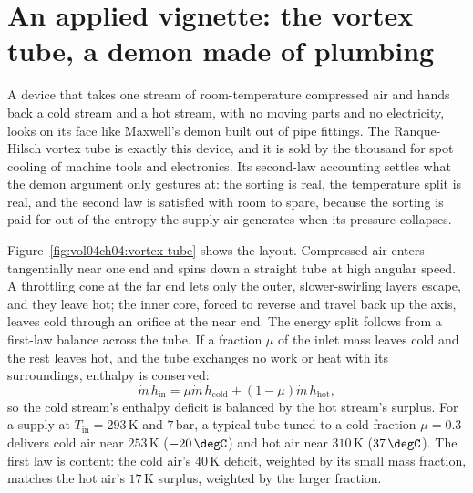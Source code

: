 

\section{An applied vignette: the vortex tube, a demon made of plumbing}

A device that takes one stream of room-temperature compressed air and hands back
a cold stream and a hot stream, with no moving parts and no electricity, looks
on its face like Maxwell's demon built out of pipe fittings. The Ranque-Hilsch
vortex tube is exactly this device, and it is sold by the thousand for spot
cooling of machine tools and electronics. Its second-law accounting settles what
the demon argument only gestures at: the sorting is real, the temperature split
is real, and the second law is satisfied with room to spare, because the sorting
is paid for out of the entropy the supply air generates when its pressure
collapses.

Figure~\ref{fig:vol04ch04:vortex-tube} shows the layout. Compressed air enters
tangentially near one end and spins down a straight tube at high angular speed.
A throttling cone at the far end lets only the outer, slower-swirling layers
escape, and they leave hot; the inner core, forced to reverse and travel back up
the axis, leaves cold through an orifice at the near end. The energy split
follows from a first-law balance across the tube. If a fraction $\mu$ of the
inlet mass leaves cold and the rest leaves hot, and the tube exchanges no work
or heat with its surroundings, enthalpy is conserved:
\[
\dot m\, h_{\text{in}} = \mu \dot m\, h_{\text{cold}} + (1-\mu)\dot m\,
h_{\text{hot}},
\]
so the cold stream's enthalpy deficit is balanced by the hot stream's surplus.
For a supply at $T_{\text{in}} = 293\,\si{\kelvin}$ and $7\,\text{bar}$, a
typical tube tuned to a cold fraction $\mu = 0.3$ delivers cold air near
$253\,\si{\kelvin}$ ($-20\,\degC$) and hot air near $310\,\si{\kelvin}$
($37\,\degC$). The first law is content: the cold air's $40\,\si{\kelvin}$
deficit, weighted by its small mass fraction, matches the hot air's
$17\,\si{\kelvin}$ surplus, weighted by the larger fraction.

